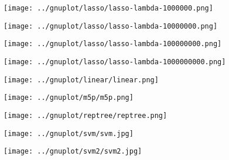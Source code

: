 \documentclass[10pt,a4paper]{article}
\begin{document}
\texttt{[image: ../gnuplot/lasso/lasso-lambda-1000000.png]}

\texttt{[image: ../gnuplot/lasso/lasso-lambda-10000000.png]}

\texttt{[image: ../gnuplot/lasso/lasso-lambda-100000000.png]}

\texttt{[image: ../gnuplot/lasso/lasso-lambda-1000000000.png]}

\texttt{[image: ../gnuplot/linear/linear.png]}

\texttt{[image: ../gnuplot/m5p/m5p.png]}

\texttt{[image: ../gnuplot/reptree/reptree.png]}

\texttt{[image: ../gnuplot/svm/svm.jpg]}

\texttt{[image: ../gnuplot/svm2/svm2.jpg]}
\end{document}
